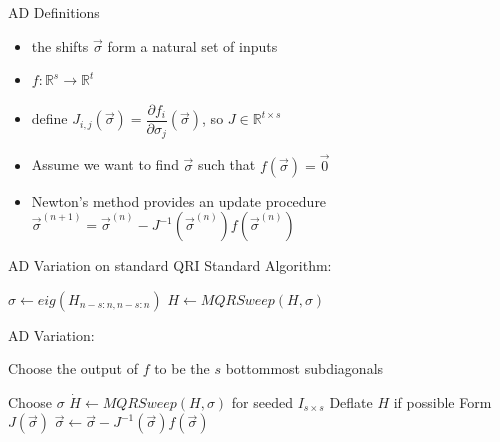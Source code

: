 \documentclass[12pt]{beamer}
\renewcommand{\d}[1]{\dot{#1}}
\begin{document}
  \begin{frame}{AD Definitions}
    \begin{itemize}
      \item the shifts $\vec{\sigma}$ form a natural set of inputs
      \item $f:\mathbb{R}^s \to \mathbb{R}^t$
      \item define $J_{i,j}(\vec{\sigma}) = \dfrac{\partial f_i}{\partial \sigma_j}(\vec{\sigma})$, so $J \in \mathbb{R}^{t \times s}$
      \item Assume we want to find $\vec{\sigma}$ such that $f(\vec{\sigma}) = \vec{0}$
      \item Newton's method provides an update procedure $\vec{\sigma}^{(n+1)} = \vec{\sigma}^{(n)} - J^{-1}(\vec{\sigma}^{(n)}) f(\vec{\sigma}^{(n)})$
    \end{itemize}
  \end{frame}


  \begin{frame}{AD Variation on standard QRI}
    Standard Algorithm:
    \begin{algorithmic}
      \Repeat
        \State $\sigma \gets eig(H_{n-s:n,n-s:n})$ 
        \State $H \gets MQRSweep(H,\sigma)$ 
    \end{algorithmic}

    AD Variation:
    
    Choose the output of $f$ to be the $s$ bottommost subdiagonals

    \begin{algorithmic}
      \State Choose $\sigma$ 
      \Repeat
        \State $\d{H} \gets MQRSweep(H,\sigma)$ for seeded $I_{s \times s}$
        \State Deflate $H$ if possible
        \State Form $J(\vec{\sigma})$
        \State $\vec{\sigma} \gets \vec{\sigma} - J^{-1}(\vec{\sigma}) f(\vec{\sigma})$
    \end{algorithmic}

  \end{frame}
\end{document}
